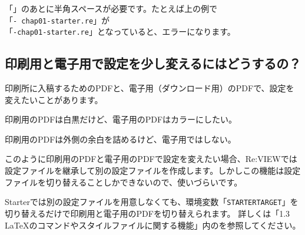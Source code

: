 \label{}
\begin{starterprogram}\end{starterprogram}

\begin{starteritemize}
\item 「\reviewem{{-}}」のあとに半角スペースが必要です。たとえば上の例で\\{}「\texttt{{-} chap01{-}starter.re}」が\\{}「\texttt{{-}chap01{-}starter.re}」となっていると、エラーになります。
\end{starteritemize}

\subsection*{印刷用と電子用で設定を少し変えるにはどうするの？}
\label{sec:2-7-2}
\label{qvtlq}

印刷所に入稿するためのPDFと、電子用（ダウンロード用）のPDFで、設定を変えたいことがあります。

\begin{starteritemize}
\item 印刷用のPDFは白黒だけど、電子用のPDFはカラーにしたい。
\item 印刷用のPDFは外側の余白を詰めるけど、電子用ではしない。
\end{starteritemize}

このように印刷用のPDFと電子用のPDFで設定を変えたい場合、Re:VIEWでは設定ファイルを継承して別の設定ファイルを作成します。しかしこの機能は設定ファイルを切り替えることしかできないので、使いづらいです。

Starterでは別の設定ファイルを用意しなくても、環境変数「\texttt{\textdollar{}STARTER\textunderscore{}TARGET}」を切り替えるだけで印刷用と電子用のPDFを切り替えられます。
詳しくは「1.3 \LaTeX{}のコマンドやスタイルファイルに関する機能」内のを参照してください。

\begin{starterterminal}\end{starterterminal}

